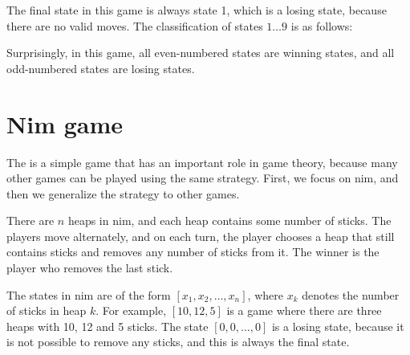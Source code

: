 The final state in this game is always state 1,
which is a losing state, because there are no
valid moves.
The classification of states $1 \ldots 9$
is as follows:

\begin{center}
\end{center}

Surprisingly, in this game,
all even-numbered states are winning states,
and all odd-numbered states are losing states.

\section{Nim game}


The  is a simple game that
has an important role in game theory,
because many other games can be played using
the same strategy.
First, we focus on nim,
and then we generalize the strategy
to other games.

There are $n$ heaps in nim,
and each heap contains some number of sticks.
The players move alternately,
and on each turn, the player chooses
a heap that still contains sticks
and removes any number of sticks from it.
The winner is the player who removes the last stick.

The states in nim are of the form
$[x_1,x_2,\ldots,x_n]$,
where $x_k$ denotes the number of sticks in heap $k$.
For example, $[10,12,5]$ is a game where
there are three heaps with 10, 12 and 5 sticks.
The state $[0,0,\ldots,0]$ is a losing state,
because it is not possible to remove any sticks,
and this is always the final state.

